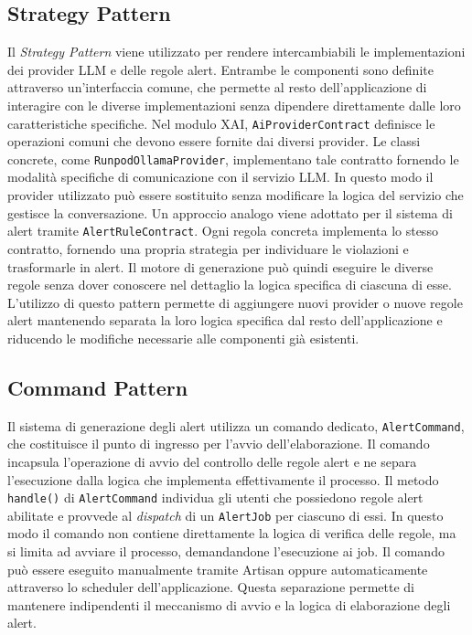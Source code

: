 \subsection{Strategy Pattern}
Il \textit{Strategy Pattern} viene utilizzato per rendere intercambiabili le implementazioni dei provider LLM e delle regole alert. Entrambe le componenti sono definite 
attraverso un'interfaccia comune, che permette al resto dell'applicazione di interagire con le diverse implementazioni senza dipendere direttamente dalle loro caratteristiche 
specifiche.
\newline
Nel modulo XAI, \texttt{AiProviderContract} definisce le operazioni comuni che devono essere fornite dai diversi provider. Le classi concrete, come \texttt{RunpodOllamaProvider}, 
implementano tale contratto fornendo le modalità specifiche di comunicazione con il servizio LLM. In questo modo il provider utilizzato può essere sostituito senza modificare la 
logica del servizio che gestisce la conversazione.
\newline
Un approccio analogo viene adottato per il sistema di alert tramite \texttt{AlertRuleContract}. Ogni regola concreta implementa lo stesso contratto, fornendo una propria 
strategia per individuare le violazioni e trasformarle in alert. Il motore di generazione può quindi eseguire le diverse regole senza dover conoscere nel dettaglio la logica 
specifica di ciascuna di esse.
\newline
L'utilizzo di questo pattern permette di aggiungere nuovi provider o nuove regole alert mantenendo separata la loro logica specifica dal resto dell'applicazione e riducendo le 
modifiche necessarie alle componenti già esistenti.

\subsection{Command Pattern}
Il sistema di generazione degli alert utilizza un comando dedicato, \texttt{AlertCommand}, che costituisce il punto di ingresso per l'avvio dell'elaborazione. Il comando 
incapsula l'operazione di avvio del controllo delle regole alert e ne separa l'esecuzione dalla logica che implementa effettivamente il processo.
\newline
Il metodo \texttt{handle()} di \texttt{AlertCommand} individua gli utenti che possiedono regole alert abilitate e provvede al \textit{dispatch} di un \texttt{AlertJob} per 
ciascuno di essi. In questo modo il comando non contiene direttamente la logica di verifica delle regole, ma si limita ad avviare il processo, demandandone l'esecuzione ai job.
\newline
Il comando può essere eseguito manualmente tramite Artisan oppure automaticamente attraverso lo scheduler dell'applicazione. Questa separazione permette di mantenere indipendenti 
il meccanismo di avvio e la logica di elaborazione degli alert.

